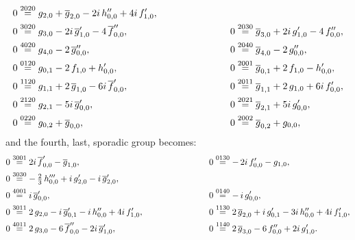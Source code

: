 \documentclass[12pt,twoside,leqno,openany]{amsart}
\begin{document}
\[
\aligned
0
&
\overset{2020}{\,\,=\,\,}
g_{2,0}
+
\overline{g}_{2,0}
-
2i\,h_{0,0}''
+
4i\,f_{1,0}',
&
\ \ \ \ \ \ \ \ \ \ \ \ \ \ \ \ \ \ \ \
&
\\
0
&
\overset{3020}{\,\,=\,\,}
g_{3,0}
-
2i\,\overline{g}_{1,0}'
-
4\,\overline{f}_{0,0}'',
&
\ \ \ \ \ \ \ \ \ \ \ \ \ \ \ \ \ \ \ \
0
&
\overset{2030}{\,\,=\,\,}
\overline{g}_{3,0}
+
2i\,g_{1,0}'
-
4\,f_{0,0}'',
\\
0
&
\overset{4020}{\,\,=\,\,}
g_{4,0}
-
2\,\overline{g}_{0,0}'',
&
\ \ \ \ \ \ \ \ \ \ \ \ \ \ \ \ \ \ \ \
0
&
\overset{2040}{\,\,=\,\,}
\overline{g}_{4,0}
-
2\,g_{0,0}'',
\\
0
&
\overset{0120}{\,\,=\,\,}
g_{0,1}
-
2\,f_{1,0}
+
h_{0,0}',
&
\ \ \ \ \ \ \ \ \ \ \ \ \ \ \ \ \ \ \ \
0
&
\overset{2001}{\,\,=\,\,}
\overline{g}_{0,1}
+
2\,f_{1,0}
-
h_{0,0}',
\\
0
&
\overset{1120}{\,\,=\,\,}
g_{1,1}
+
2\,\overline{g}_{1,0}
-
6i\,\overline{f}_{0,0}',
&
\ \ \ \ \ \ \ \ \ \ \ \ \ \ \ \ \ \ \ \
0
&
\overset{2011}{\,\,=\,\,}
\overline{g}_{1,1}
+
2\,g_{1,0}
+
6i\,f_{0,0}',
\\
0
&
\overset{2120}{\,\,=\,\,}
g_{2,1}
-
5i\,\overline{g}_{0,0}',
&
\ \ \ \ \ \ \ \ \ \ \ \ \ \ \ \ \ \ \ \
0
&
\overset{2021}{\,\,=\,\,}
\overline{g}_{2,1}
+
5i\,g_{0,0}',
\\
0
&
\overset{0220}{\,\,=\,\,}
g_{0,2}
+
\overline{g}_{0,0},
&
\ \ \ \ \ \ \ \ \ \ \ \ \ \ \ \ \ \ \ \
0
&
\overset{2002}{\,\,=\,\,}
\overline{g}_{0,2}
+
g_{0,0},
\endaligned
\]
and the fourth, last, sporadic group becomes:
\[
\aligned
0
&
\overset{3001}{\,\,=\,\,}
2i\,\overline{f}_{0,0}'
-
\overline{g}_{1,0},
&
\ \ \ \ \ \ \ \ \ \ \ \ \ \ \ \ \ \ \ \
0
&
\overset{0130}{\,\,=\,\,}
-\,2i\,f_{0,0}'
-
g_{1,0},
\\
0
&
\overset{3030}{\,\,=\,\,}
-\,\tfrac{2}{3}\,h_{0,0}'''
+
i\,g_{2,0}'
-
i\,\overline{g}_{2,0}',
&
\ \ \ \ \ \ \ \ \ \ \ \ \ \ \ \ \ \ \ \
&
\\
0
&
\overset{4001}{\,\,=\,\,}
i\,\overline{g}_{0,0}',
&
\ \ \ \ \ \ \ \ \ \ \ \ \ \ \ \ \ \ \ \
0
&
\overset{0140}{\,\,=\,\,}
-\,i\,g_{0,0}',
\\
0
&
\overset{3011}{\,\,=\,\,}
2\,g_{2,0}
-
i\,\overline{g}_{0,1}'
-
i\,h_{0,0}''
+
4i\,f_{1,0}',
&
\ \ \ \ \ \ \ \ \ \ \ \ \ \ \ \ \ \ \ \
0
&
\overset{1130}{\,\,=\,\,}
2\,\overline{g}_{2,0}
+
i\,g_{0,1}'
-
3i\,h_{0,0}''
+
4i\,f_{1,0}',
\\
0
&
\overset{4011}{\,\,=\,\,}
2\,g_{3,0}
-
6\,\overline{f}_{0,0}''
-
2i\,\overline{g}_{1,0}',
&
\ \ \ \ \ \ \ \ \ \ \ \ \ \ \ \ \ \ \ \
0
&
\overset{1140}{\,\,=\,\,}
2\,\overline{g}_{3,0}
-
6\,f_{0,0}''
+
2i\,g_{1,0}'.
\endaligned
\]
\end{document}
